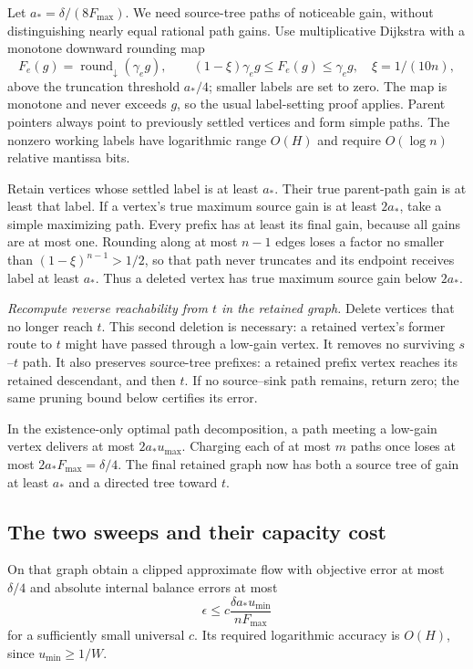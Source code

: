 \documentclass[11pt]{article}
\theoremstyle{definition}\newtheorem{definition}[theorem]{Definition}
\theoremstyle{remark}\newtheorem{remark}[theorem]{Remark}
\begin{document}
Let $a_*=\delta/(8F_{\max})$. We need source-tree paths of noticeable
gain, without distinguishing nearly equal rational path gains.
Use multiplicative Dijkstra with a monotone downward rounding map
\[
 F_e(g)=\operatorname{round}_{\downarrow}(\gamma_e g),
 \qquad (1-\xi)\gamma_e g\le F_e(g)\le\gamma_e g,
 \quad \xi=1/(10n),
\]
above the truncation threshold $a_*/4$; smaller labels are set to zero.
The map is monotone and never exceeds $g$, so the usual label-setting
proof applies. Parent pointers always point to previously settled
vertices and form simple paths. The nonzero working labels have
logarithmic range $O(H)$ and require $O(\log n)$ relative mantissa bits.

Retain vertices whose settled label is at least $a_*$. Their true
parent-path gain is at least that label. If a vertex's true maximum
source gain is at least $2a_*$, take a simple maximizing path.
Every prefix has at least its final gain, because all gains are at most
one. Rounding along at most $n-1$ edges loses a factor no smaller than
$(1-\xi)^{n-1}>1/2$, so that path never truncates and its endpoint
receives label at least $a_*$. Thus a deleted vertex has true maximum
source gain below $2a_*$.

\emph{Recompute reverse reachability from $t$ in the retained graph.}
Delete vertices that no longer reach $t$. This second deletion is
necessary: a retained vertex's former route to $t$ might have passed
through a low-gain vertex. It removes no surviving $s$--$t$ path.
It also preserves source-tree prefixes: a retained prefix vertex
reaches its retained descendant, and then $t$.
If no source--sink path remains, return zero; the same pruning bound
below certifies its error.

In the existence-only optimal path decomposition, a path meeting a
low-gain vertex delivers at most $2a_*u_{\max}$. Charging each of at
most $m$ paths once loses at most $2a_*F_{\max}=\delta/4$.
The final retained graph now has both a source tree of gain at least
$a_*$ and a directed tree toward $t$.

\subsection{The two sweeps and their capacity cost}

On that graph obtain a clipped approximate flow with objective error
at most $\delta/4$ and absolute internal balance errors at most
\begin{equation}\label{eq:repair-accuracy}
 \epsilon\le c\frac{\delta a_*u_{\min}}{nF_{\max}}
\end{equation}
for a sufficiently small universal $c$. Its required logarithmic
accuracy is $O(H)$, since $u_{\min}\ge1/W$.
\end{document}
